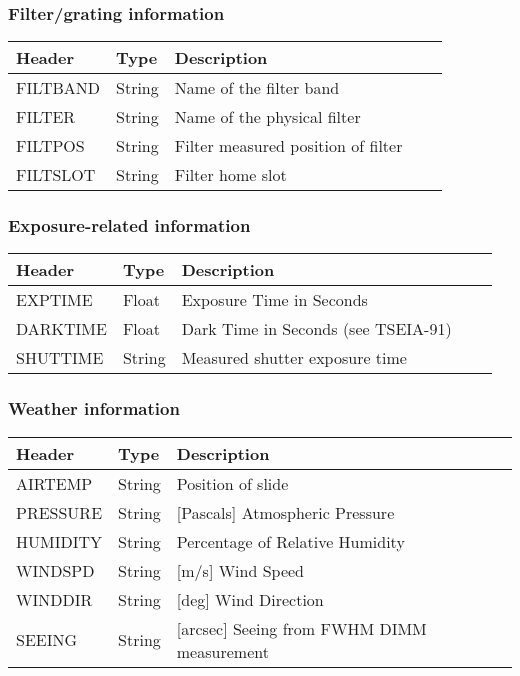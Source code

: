 \subsubsection{Filter/grating information}
\begin{tabular}{l l l l l}

\hline
Header & Type & Description \\
\hline
FILTBAND & String & Name of the filter band \\
FILTER & String & Name of the physical filter \\
FILTPOS & String & Filter measured position of filter \\
FILTSLOT & String & Filter home slot \\
\hline
\end{tabular}


\subsubsection{Exposure-related information}
\begin{tabular}{l l l l l}

\hline
Header & Type & Description \\
\hline
EXPTIME & Float & Exposure Time in Seconds \\
DARKTIME & Float & Dark Time in Seconds (see TSEIA-91) \\
SHUTTIME & String & Measured shutter exposure time \\
\hline
\end{tabular}


\subsubsection{Weather information}
\begin{tabular}{l l l l l}

\hline
Header & Type & Description \\
\hline
AIRTEMP & String & Position of slide \\
PRESSURE & String & [Pascals] Atmospheric Pressure \\
HUMIDITY & String & Percentage of Relative Humidity \\
WINDSPD & String & [m/s] Wind Speed \\
WINDDIR & String & [deg] Wind Direction \\
SEEING & String & [arcsec] Seeing from FWHM DIMM measurement \\
\hline
\end{tabular}


